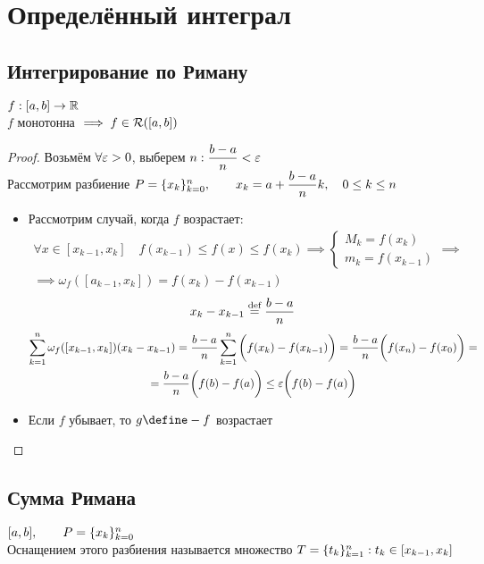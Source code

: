 \chapter{Определённый интеграл}

\section{Интегрирование по Риману}

\begin{theorem}
	$ f : [a, b] \to \R $ \\
	$ f $ монотонна $ \implies f \in \Ri([a, b]) $
\end{theorem}

\begin{proof}
	Возьмём $ \forall \veps > 0 $, выберем $ n : \dfrac{b - a}n < \veps $ \\
	Рассмотрим разбиение $ P = \seqz[n]{x_k}k, \qquad x_k = a + \dfrac{b - a}nk, \quad 0 \le k \le n $
	\begin{itemize}
		\item Рассмотрим случай, когда $ f $ возрастает:
		\begin{multline*}
			\forall x \in [x_{k - 1}, x_k] \quad f(x_{k - 1}) \le f(x) \le f(x_k) \implies
			\begin{cases}
				M_k = f(x_k) \\
				m_k = f(x_{k - 1})
			\end{cases} \implies \\ \implies \omega_f([a_{k - 1}, x_k]) = f(x_k) - f(x_{k - 1})
		\end{multline*}
		$$ x_k - x_{k - 1} \bydef \frac{b - a}n $$
		\begin{multline*}
			\sum_{k = 1}^n \omega_f([x_{k - 1}, x_k])(x_k - x_{k - 1}) = \frac{b - a}n \sum_{k = 1}^n \bigg( f(x_k) - f(x_{k - 1}) \bigg) = \frac{b - a}n \bigg( f(x_n) - f(x_0) \bigg) = \\ = \frac{b - a}n \bigg( f(b) - f(a) \bigg) \le \veps \bigg( f(b) - f(a) \bigg)
		\end{multline*}
		\item Если $ f $ убывает, то $ g \define -f $ возрастает
	\end{itemize}
\end{proof}

\section{Сумма Римана}

\begin{definition}
	$ [a, b], \qquad P = \seqz[n]{x_k}k $ \\
	Оснащением этого разбиения называется множество $ T = \seq[n]{t_k}k : t_k \in [x_{k - 1}, x_k] $
\end{definition}

